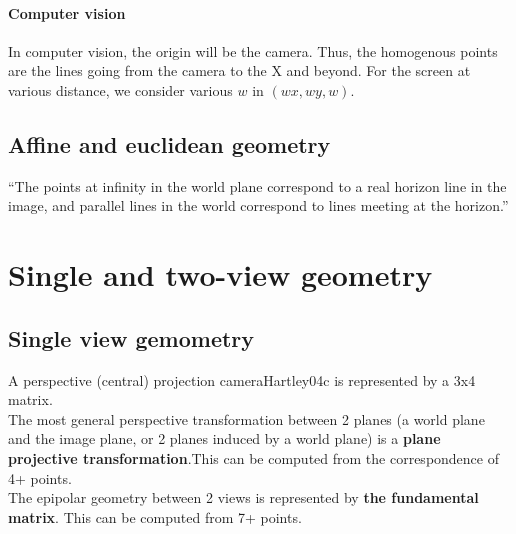 \documentclass[../main.tex]{subfiles}
\begin{document}
\paragraph{Computer vision}
In computer vision, the origin will be the camera. Thus, the homogenous points are the lines going from the camera
to the X and beyond. For the screen at various distance, we consider various $w$ in $(wx, wy, w)$.


\subsection{Affine and euclidean geometry}
\begin{displayquote}
    \enquote{The points at infinity in the world plane correspond to a real horizon line in the image,
        and parallel lines in the world correspond to lines meeting at the horizon.}
\end{displayquote}





\section{Single and two-view geometry}
\subsection{Single view gemometry}
A perspective (central) projection cameraHartley04c is represented by a 3x4 matrix. \\
The most general perspective transformation between 2 planes (a world plane and the image plane, or
2 planes induced by a world plane) is a \textbf{plane projective transformation}.This can be computed from
the correspondence of 4+ points. \\
The epipolar geometry between 2 views is represented by \textbf{the fundamental matrix}. This can be computed
from 7+ points.
\end{document}
